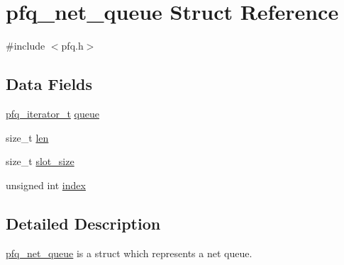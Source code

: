 \hypertarget{structpfq__net__queue}{\section{pfq\-\_\-net\-\_\-queue Struct Reference}
\label{structpfq__net__queue}
}


{\ttfamily \#include $<$pfq.\-h$>$}

\subsection*{Data Fields}
\begin{DoxyCompactItemize}
\item 
\hyperlink{pfq_8h_a6e330e8e393bb4b5ecefdd5bf47a6f57}{pfq\-\_\-iterator\-\_\-t} \hyperlink{structpfq__net__queue_a4858e72d7edbe741638986afc0ba9282}{queue}
\item 
size\-\_\-t \hyperlink{structpfq__net__queue_a4b511d3c1dbd8d9ed36008500bd44350}{len}
\item 
size\-\_\-t \hyperlink{structpfq__net__queue_ad15e389ac5a91523cccb571c094d3f4e}{slot\-\_\-size}
\item 
unsigned int \hyperlink{structpfq__net__queue_af66bc8d91f38d0d6c218c9bae8081185}{index}
\end{DoxyCompactItemize}


\subsection{Detailed Description}
\hyperlink{structpfq__net__queue}{pfq\-\_\-net\-\_\-queue} is a struct which represents a net queue. 

